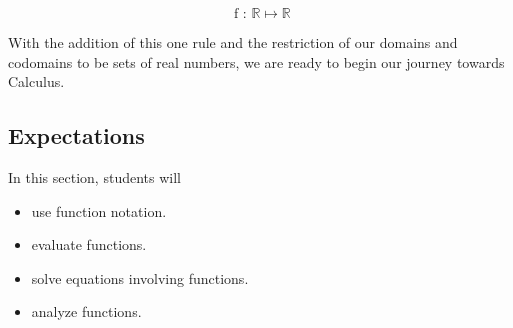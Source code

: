 \documentclass{ximera}
\begin{document}
\[
\text{ f : } \mathbb{R} \mapsto \mathbb{R}
\]


With the addition of this one rule and the restriction of our domains and codomains to be sets of real numbers, we are ready to begin our journey towards Calculus.








\subsection{Expectations}


\begin{sectionOutcomes}
In this section, students will 

\begin{itemize}
\item use function notation.
\item evaluate functions.
\item solve equations involving functions.
\item analyze functions.
\end{itemize}
\end{sectionOutcomes}
\end{document}
